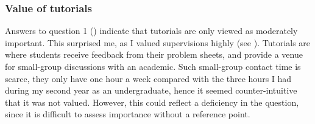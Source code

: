\subsubsection{Value of tutorials}\label{sec:tutorial-value}

Answers to question 1 () indicate that tutorials are only viewed as moderately important. This surprised me, as I valued supervisions highly (see ). Tutorials are where students receive feedback from their problem sheets, and provide a venue for small-group discussions with an academic. Such small-group contact time is scarce, they only have one hour a week compared with the three hours I had during my second year as an undergraduate, hence it seemed counter-intuitive that it was not valued. However, this could reflect a deficiency in the question, since it is difficult to assess importance without a reference point.


